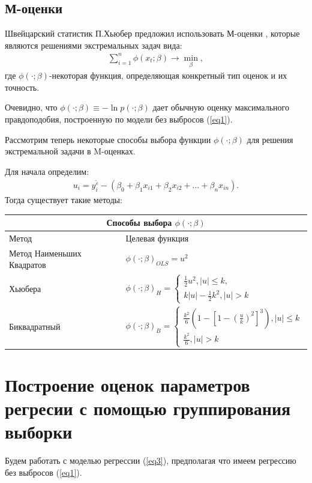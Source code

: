 \documentclass[a4paper,14pt]{extarticle}
\begin{document}
\subsection{М-оценки}
Швейцарский статистик П.Хьюбер предложил использовать М-оценки \cite{Kharin}, которые являются решениями экстремальных задач вида:
\begin{eqnarray}
    \sum_{i=1}^{n}\phi(x_t;\beta)\rightarrow \min_{\beta},
\end{eqnarray}
где $\phi(\cdot;\beta)$-некоторая функция, определяющая конкретный тип оценок и их точность.

Очевидно, что $\phi(\cdot;\beta)\equiv - \ln{p(\cdot;\beta)}$ дает обычную оценку максимального правдоподобия, построенную по модели без выбросов (\ref{eq1}).

Рассмотрим теперь некоторые способы выбора функции $\phi(\cdot;\beta)$ для решения экстремальной задачи в M-оценках.

Для начала определим:
\begin{eqnarray}
    u_i=y_i^{\widetilde{\varepsilon}}-(\beta_0+\beta_1 x_{i1}+\beta_2 x_{i2}+\dots+\beta_n x_{in}).
\end{eqnarray}
Тогда существует такие методы\cite{RobustRegression}:\hfill\break
\begin{center}
\begin{tabular}{ |p{3cm}|p{10cm} | }
    \hline
    \multicolumn{2}{|c|}{Способы выбора $\phi(\cdot;\beta)$} \\
    \hline
    Метод& Целевая функция\\
    \hline
    Метод Наименьших Квадратов&$\phi(\cdot;\beta)_{OLS}=u^2$\\
    \hline
    Хьюбера&$\phi(\cdot;\beta)_{H}=
        \begin{cases}
            \frac{1}{2}u^2, |u|\leq k,\\
            k|u|-\frac{1}{2}k^2, |u|>k
        \end{cases}$\\
    \hline
    Биквадратный& $\phi(\cdot;\beta)_{B}=
    \begin{cases}
        \frac{k^2}{6}(1-[1-(\frac{u}{k})^2]^3), |u|\leq k\\
        \frac{k^2}{6}, |u|>k
    \end{cases}$\\
    \hline
\end{tabular}
\end{center}
\newpage

\section{Построение оценок параметров регресии с помощью группирования выборки}\label{sec4}
Будем работать с моделью регрессии (\ref{eq3}), предполагая что имеем регрессию без выбросов (\ref{eq1}). 
\end{document}
